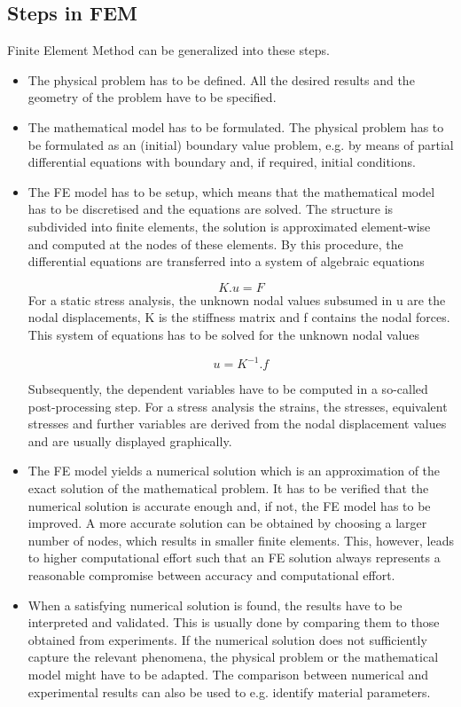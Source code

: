\subsection{Steps in FEM}
Finite Element Method can be generalized into these steps.
\begin{itemize}
 
 \item The physical problem has to be defined. All the desired results and the geometry of the problem have to be specified.

\item The mathematical model has to be formulated.
The physical problem has to be formulated as an (initial) boundary value problem, e.g. by means of partial differential equations with boundary and, if required, initial conditions.

\item The FE model has to be setup, which means that the mathematical model has to be discretised and the equations are solved. The structure is subdivided into finite elements, the solution is approximated element-wise and computed at the nodes of these elements. By this procedure, the differential equations are transferred into a system of algebraic equations

\begin{equation}
K.u = F
\end{equation}
For a static stress analysis, the unknown nodal values subsumed in u are the nodal displacements, K is the stiffness matrix and f contains the nodal forces. This system of equations has to be solved for the unknown nodal values

\begin{equation}
u = K^{-1}.f
\end{equation}

Subsequently, the dependent variables have to be computed in a so-called post-processing step. For a stress analysis the strains, the stresses, equivalent stresses and further variables are derived from the nodal displacement values and are usually displayed graphically.

\item The FE model yields a numerical solution which is an approximation of the exact solution of the mathematical problem. It has to be verified that the numerical solution is accurate enough and, if not, the FE model has to be improved. A more accurate solution can be obtained by choosing a larger number of nodes, which results in smaller finite elements. This, however, leads to higher computational effort such that an FE solution always represents a reasonable compromise between accuracy and computational effort.


\item When a satisfying numerical solution is found, the results have to be interpreted and validated. This is usually done by comparing them to those obtained from experiments. If the numerical solution does not sufficiently capture the relevant phenomena, the physical problem or the mathematical model might have to be adapted. The comparison between numerical and experimental results can also be used to e.g. identify material parameters.
\end{itemize}
